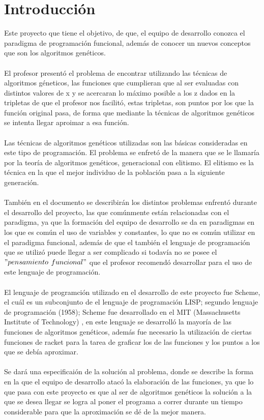 \documentclass[10pt,a4paper]{article}
\begin{document}
\section{Introducción}
\bigskip
\bigskip 
\bigskip 
\bigskip 
	Este proyecto que tiene el objetivo, de que, el equipo de desarrollo conozca el paradigma de programación funcional, además de conocer un nuevos conceptos que son los algoritmos genéticos.\\\\
	El profesor presentó el problema de encontrar utilizando las técnicas de algoritmos géneticos, las funciones que cumplieran que al ser evaluadas con distintos valores de x y se acercaran lo máximo posible a los z dados en la tripletas de que el profesor nos facilitó, estas tripletas, son puntos por los que la función original pasa, de forma que mediante la técnicas de algoritmos genéticos se intenta llegar aproimar a esa función.\\\\
	Las técnicas de algoritmos genéticos utilizadas son las básicas consideradas en este tipo de programación. El problema se enfretó de la manera que se le llamaría por la teoría de algoritmos genéticos, generacional con elitismo. El elitismo es la técnica en la que el mejor individuo de la población pasa a la siguiente generación.\\\\
	También en el documento se describirán los distintos problemas enfrentó durante el desarrollo del proyecto, las que comúnmente  están relacionadas con el paradigma, ya que la formación del equipo de desarrollo se da en paradigmas en los que es común el uso de variables y constantes, lo que no es común utilizar en el paradigma funcional, además de que el también el lenguaje de programación que se utilizó puede llegar a ser complicado si todavía no se posee el $"pensamiento$  $funcional"$ que el profesor recomendó desarrollar para el uso de este lenguaje de programación.\\\\
	El lenguaje de programción utilizado en el desarrollo de este proyecto fue Scheme, el cuál es un subconjunto de el lenguaje de programación LISP; segundo lenguaje de programación (1958); Scheme fue desarrollado en el MIT (Massachusetts Institute of Technology) , en este lenguaje se desarrolló la mayoría de las funciones de algoritmos genéticos, además fue necesario la utilización de ciertas funciones de racket para la tarea de graficar los de las funciones y los puntos a los que se debía aproximar.\\\\
	Se dará una especificaión de la solución al problema, donde se describe la forma en la que el equipo de desarrollo atacó la elaboración de las funciones, ya que lo que pasa con este proyecto es que al ser de algoritmos genéticos la solución a la que se desea llegar se logra al poner el programa a correr durante un tiempo considerable para que la aproximación se dé de la mejor manera.\\ 
\pagebreak
\end{document}
